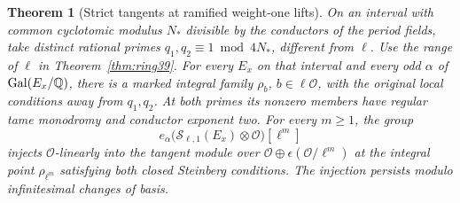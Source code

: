 \documentclass[a4paper,11pt]{article}
\newtheorem{theorem}[proposition]{Theorem}
\theoremstyle{definition}
\theoremstyle{remark}
\numberwithin{equation}{section}
\newcommand{\Sel}{\mathcal S}
\newcommand{\OO}{\mathcal O}
\begin{document}
\begin{theorem}[Strict tangents at ramified weight-one lifts]\label{thm:ststrict616}
On an interval with common cyclotomic modulus \(N_*\) divisible by
the conductors of the period fields, take distinct rational primes
\(q_1,q_2\equiv1\bmod 4N_*\), different from \(\ell\). Use the range
of \(\ell\) in Theorem~\ref{thm:ring39}. For every \(E_x\) on that
interval and every odd \(\alpha\) of \(\operatorname{Gal}(E_x/\mathbb Q)\), there is a
marked integral family \(\rho_b\), \(b\in\ell\OO\), with the original
local conditions away from \(q_1,q_2\). At both primes its nonzero
members have regular tame monodromy and conductor exponent two.
For every \(m\ge1\), the group
\[
         e_\alpha\big(\Sel_{\ell,1}(E_x)\otimes\OO\big)[\ell^m]
\]
injects \(\OO\)-linearly into the tangent module over
\(\OO\oplus\epsilon(\OO/\ell^m)\) at the integral point
\(\rho_{\ell^m}\) satisfying both closed Steinberg conditions.
The injection persists modulo infinitesimal changes of basis.
\end{theorem}
\end{document}
